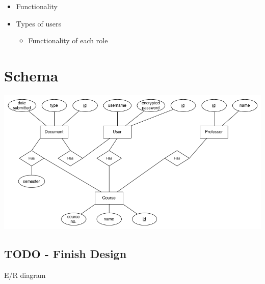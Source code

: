 \documentclass[11pt]{article}
\begin{document}
\begin{itemize}
\item Functionality
\item Types of users
\begin{itemize}
\item Functionality of each role
\end{itemize}
\end{itemize}
\section*{Schema}
\label{sec-3}


  \includegraphics[width=.9\linewidth]{ER Diagram.png}
\subsection*{\textbf{TODO} - Finish Design}
\label{sec-3-1}

   E/R diagram
\end{document}

